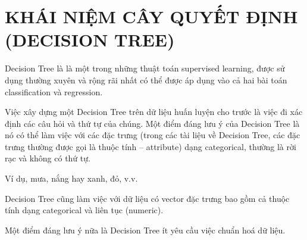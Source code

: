 \chapter{KHÁI NIỆM CÂY QUYẾT ĐỊNH (DECISION TREE)}

Decision Tree là là một trong những thuật toán supervised learning,
được sử dụng thường xuyên và rộng rãi nhất có thể được áp dụng vào
cả hai bài toán classification và regression.

Việc xây dựng một Decision Tree trên dữ liệu huấn luyện cho trước
là việc đi xác định các câu hỏi và thứ tự của chúng. Một điểm đáng
lưu ý của Decision Tree là nó có thể làm việc với các đặc trưng
(trong các tài liệu về Decision Tree, các đặc trưng thường được gọi là
thuộc tính – attribute) dạng categorical, thường là rời rạc và không có thứ tự.

Ví dụ, mưa, nắng hay xanh, đỏ, v.v.

Decision Tree cũng làm việc với dữ liệu có vector đặc trưng bao gồm
cả thuộc tính dạng categorical và liên tục (numeric).

Một điểm đáng lưu ý nữa là Decision Tree ít yêu cầu việc chuẩn hoá dữ liệu.
